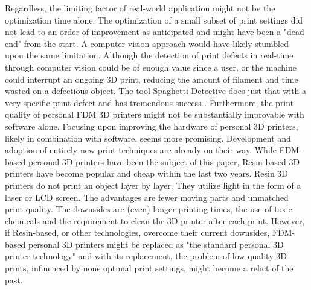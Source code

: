 Regardless, the limiting factor of real-world application might not be the optimization time alone. The optimization of a small subset of print settings did not lead to an order of improvement as anticipated and might have been a "dead end" from the start. A computer vision approach would have likely stumbled upon the same limitation. Although the detection of print defects in real-time through computer vision could be of enough value since a user, or the machine could interrupt an ongoing 3D print, reducing the amount of filament and time wasted on a defectious object. The tool Spaghetti Detective does just that with a very specific print defect and has tremendous success \cite{spaghettiDetective}. Furthermore, the print quality of personal FDM 3D printers might not be substantially improvable with software alone. Focusing upon improving the hardware of personal 3D printers, likely in combination with software, seems more promising. Development and adoption of entirely new print techniques are already on their way. While FDM-based personal 3D printers have been the subject of this paper, Resin-based 3D printers have become popular and cheap within the last two years. Resin 3D printers do not print an object layer by layer. They utilize light in the form of a laser or LCD screen. The advantages are fewer moving parts and unmatched print quality. The downsides are (even) longer printing times, the use of toxic chemicals and the requirement to clean the 3D printer after each print. However, if Resin-based, or other technologies, overcome their current downsides, FDM-based personal 3D printers might be replaced as "the standard personal 3D printer technology" and with its replacement, the problem of low quality 3D prints, influenced by none optimal print settings, might become a relict of the past.
